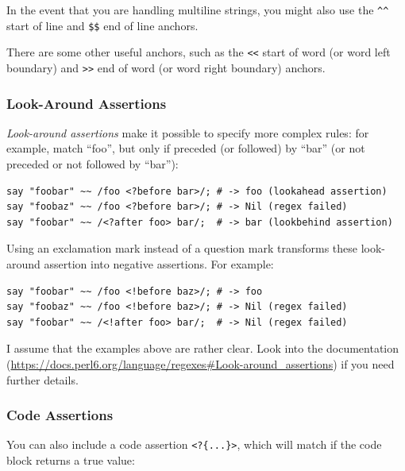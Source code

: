 In the event that you are handling multiline strings, you might 
also use the \verb'^^' start of line and \verb'$$' end of line anchors.

There are some other useful anchors, such as the \verb'<<' 
start of word (or word left boundary) and \verb'>>' end 
of word (or word right boundary) anchors.

\subsubsection{Look-Around Assertions}


\emph{Look-around assertions} make it possible to 
specify more complex rules: for example, match ``foo'', 
but only if preceded (or followed) by ``bar'' (or not 
preceded or not followed by ``bar''):

\begin{verbatim}
say "foobar" ~~ /foo <?before bar>/; # -> foo (lookahead assertion)
say "foobaz" ~~ /foo <?before bar>/; # -> Nil (regex failed)
say "foobar" ~~ /<?after foo> bar/;  # -> bar (lookbehind assertion)
\end{verbatim}
%
Using an exclamation mark instead of a question mark transforms 
these look-around assertion into negative assertions. For example:

\begin{verbatim}
say "foobar" ~~ /foo <!before baz>/; # -> foo 
say "foobaz" ~~ /foo <!before baz>/; # -> Nil (regex failed)
say "foobar" ~~ /<!after foo> bar/;  # -> Nil (regex failed)
\end{verbatim}
%
I assume that the examples above are rather clear. Look into the 
documentation 
(\url{https://docs.perl6.org/language/regexes#Look-around_assertions}) 
if you need further details. 

\subsubsection{Code Assertions}

You can also include a code assertion \verb'<?{...}>', which 
will match if the code block returns a true value:

